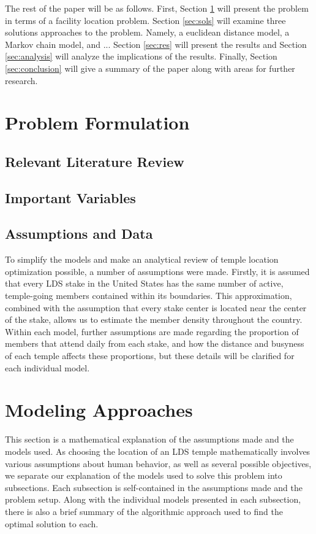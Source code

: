 \documentclass[twoside,twocolumn]{article}
\begin{document}
The rest of the paper will be as follows.
First, Section \ref{sec:prob} will present the problem in terms of a facility location problem.
Section \ref{sec:sols} will examine three solutions approaches to the problem.
Namely, a euclidean distance model, a Markov chain model, and ... %
Section \ref{sec:res} will present the results and Section \ref{sec:analysis} will analyze the implications of the results.
Finally, Section \ref{sec:conclusion} will give a summary of the paper along with areas for further research.

\section{Problem Formulation}
\label{sec:prob}
\subsection{Relevant Literature Review}
\subsection{Important Variables}
\subsection{Assumptions and Data}
To simplify the models and make an analytical review of temple location optimization possible, a number of assumptions were made. Firstly, it is assumed that every LDS stake in the United States has the same number of active, temple-going members contained within its boundaries. This approximation, combined with the assumption that every stake center is located near the center of the stake, allows us to estimate the member density throughout the country. Within each model, further assumptions are made regarding the proportion of members that attend daily from each stake, and how the distance and busyness of each temple affects these proportions, but these details will be clarified for each individual model.

\section{Modeling Approaches}
\label{sec:models}
This section is a mathematical explanation of the assumptions made and the models used. As choosing the location of an LDS temple mathematically involves various assumptions about human behavior, as well as several possible objectives, we separate our explanation of the models used to solve this problem into subsections. Each subsection is self-contained in the assumptions made and the problem setup. Along with the individual models presented in each subsection, there is also a brief summary of the algorithmic approach used to find the optimal solution to each.
\end{document}
